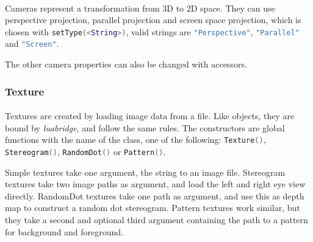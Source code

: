 \paragraph{}
Cameras represent a transformation from 3D to 2D space.
They can use perspective projection, parallel projection and screen space projection, which is chosen with \lstinline[language=lua]{setType(<String>)}, valid strings are \lstinline[language=lua]{"Perspective"}, \lstinline[language=lua]{"Parallel"} and \lstinline[language=lua]{"Screen"}.

The other camera properties can also be changed with accessors.

\subsubsection{Texture}
\paragraph{}
Textures are created by loading image data from a file.
Like objects, they are bound by \textit{luabridge}, and follow the same rules.
The constructors are global functions with the name of the class, one of the following:
\lstinline[language=lua]{Texture()}, \lstinline[language=lua]{Stereogram()}, \lstinline[language=lua]{RandomDot()} or \lstinline[language=lua]{Pattern()}.

Simple textures take one argument, the string to an image file.
Stereogram textures take two image paths as argument, and load the left and right eye view directly.
RandomDot textures take one path as argument, and use this as depth map to construct a random dot stereogram.
Pattern textures work similar, but they take a second and optional third argument containing the path to a pattern for background and foreground.

